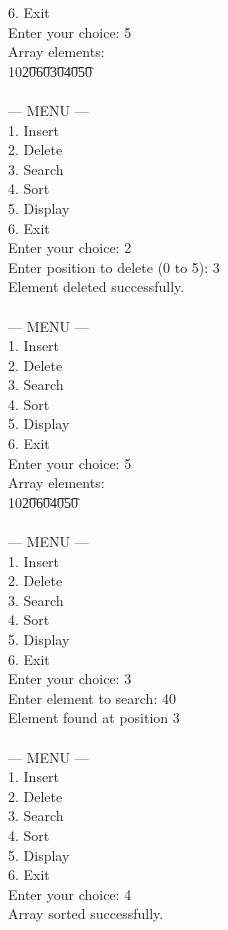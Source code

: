\documentclass[12pt,a4paper]{article}
\begin{document}
\begin{tcolorbox}[terminalstyle, title=Sample Output]
{6. Exit\\
Enter your choice: 5\\
Array elements:\\
10\t20\t60\t30\t40\t50\\
\\
--- MENU ---\\
1. Insert\\
2. Delete\\
3. Search\\
4. Sort\\
5. Display\\
6. Exit\\
Enter your choice: 2\\
Enter position to delete (0 to 5): 3\\
Element deleted successfully.\\
\\
--- MENU ---\\
1. Insert\\
2. Delete\\
3. Search\\
4. Sort\\
5. Display\\
6. Exit\\
Enter your choice: 5\\
Array elements:\\
10\t20\t60\t40\t50\\
\\
--- MENU ---\\
1. Insert\\
2. Delete\\
3. Search\\
4. Sort\\
5. Display\\
6. Exit\\
Enter your choice: 3\\
Enter element to search: 40\\
Element found at position 3\\
\\
--- MENU ---\\
1. Insert\\
2. Delete\\
3. Search\\
4. Sort\\
5. Display\\
6. Exit\\
Enter your choice: 4\\
Array sorted successfully.\\
\\
}
\end{tcolorbox}
\end{document}
